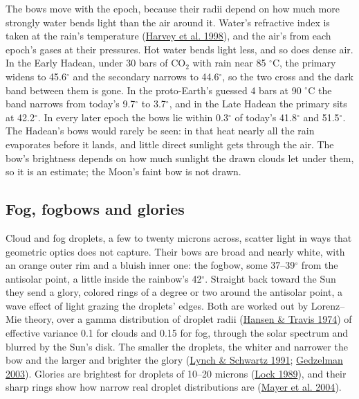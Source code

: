\documentclass[9pt,twocolumn]{extarticle}
\begin{document}
The bows move with the epoch, because their radii depend on how much more strongly water bends light than the air around it. Water's refractive index is taken at the rain's temperature (\protect\hyperlink{cite.harvey1998}{Harvey et al. 1998}), and the air's from each epoch's gases at their pressures. Hot water bends light less, and so does dense air. In the Early Hadean, under 30 bars of CO$_2$ with rain near 85 $^\circ$C, the primary widens to 45.6$^\circ$ and the secondary narrows to 44.6$^\circ$, so the two cross and the dark band between them is gone. In the proto-Earth's guessed 4 bars at 90 $^\circ$C the band narrows from today's 9.7$^\circ$ to 3.7$^\circ$, and in the Late Hadean the primary sits at 42.2$^\circ$. In every later epoch the bows lie within 0.3$^\circ$ of today's 41.8$^\circ$ and 51.5$^\circ$. The Hadean's bows would rarely be seen: in that heat nearly all the rain evaporates before it lands, and little direct sunlight gets through the air. The bow's brightness depends on how much sunlight the drawn clouds let under them, so it is an estimate; the Moon's faint bow is not drawn.


\subsection{Fog, fogbows and glories}\label{fog-fogbows-and-glories}

Cloud and fog droplets, a few to twenty microns across, scatter light in ways that geometric optics does not capture. Their bows are broad and nearly white, with an orange outer rim and a bluish inner one: the fogbow, some 37--39$^\circ$ from the antisolar point, a little inside the rainbow's 42$^\circ$. Straight back toward the Sun they send a glory, colored rings of a degree or two around the antisolar point, a wave effect of light grazing the droplets' edges. Both are worked out by Lorenz--Mie theory, over a gamma distribution of droplet radii (\protect\hyperlink{cite.hansen1974}{Hansen \& Travis 1974}) of effective variance 0.1 for clouds and 0.15 for fog, through the solar spectrum and blurred by the Sun's disk. The smaller the droplets, the whiter and narrower the bow and the larger and brighter the glory (\protect\hyperlink{cite.lynch1991}{Lynch \& Schwartz 1991}; \protect\hyperlink{cite.gedzelman2003}{Gedzelman 2003}). Glories are brightest for droplets of 10--20 microns (\protect\hyperlink{cite.lock1989}{Lock 1989}), and their sharp rings show how narrow real droplet distributions are (\protect\hyperlink{cite.mayer2004}{Mayer et al. 2004}).
\end{document}
